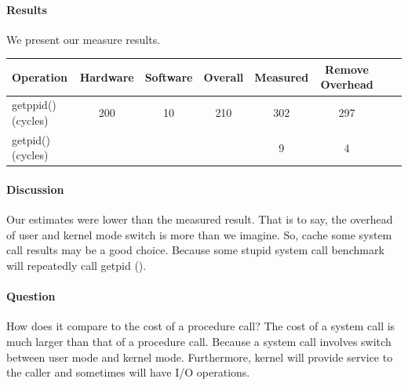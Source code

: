 \paragraph{Results}
We present our measure results.

\begin{center}
\begin{tabular}{l*{6}{c}r}
Operation              & Hardware  & Software  & Overall  & Measured & Remove Overhead  \\
\hline
getppid() (cycles) & 200 & 10 & 210 & 302 & 297  \\
getpid() (cycles) & ~ & ~ & ~ & 9 & 4  \\
\end{tabular}
\end{center}

\paragraph{Discussion}
Our estimates were lower than the measured result. That is to say, the overhead of user and kernel mode switch is more than we imagine. So, cache some system call results may be a good choice. Because some stupid system call benchmark will repeatedly call getpid ().

\paragraph{Question} How does it compare to the cost of a procedure call? The cost of a system call is much larger than that of a procedure call. Because a system call involves switch between user mode and kernel mode. Furthermore, kernel will provide service to the caller and sometimes will have I/O operations.
